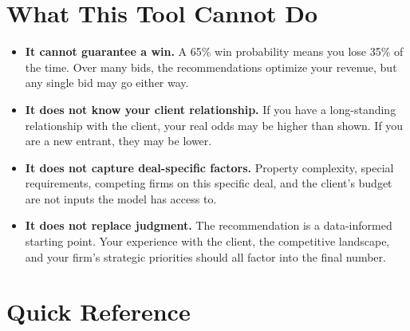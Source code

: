 \documentclass[12pt,a4paper]{article}
\begin{document}
\section{What This Tool Cannot Do}

\begin{itemize}[leftmargin=2em]
    \item \textbf{It cannot guarantee a win.} A 65\% win probability means you lose
          35\% of the time. Over many bids, the recommendations optimize your revenue,
          but any single bid may go either way.
    \item \textbf{It does not know your client relationship.} If you have a
          long-standing relationship with the client, your real odds may be higher
          than shown. If you are a new entrant, they may be lower.
    \item \textbf{It does not capture deal-specific factors.} Property complexity,
          special requirements, competing firms on this specific deal, and the
          client's budget are not inputs the model has access to.
    \item \textbf{It does not replace judgment.} The recommendation is a
          data-informed starting point. Your experience with the client, the
          competitive landscape, and your firm's strategic priorities should all
          factor into the final number.
\end{itemize}

\section{Quick Reference}
\end{document}
